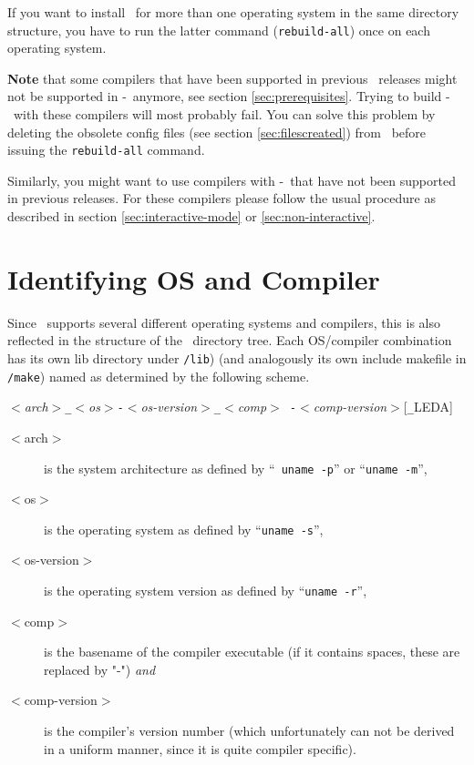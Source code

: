If you want to install \cgal\ for more than one operating system in
the same directory structure, you have to run the latter command
(\texttt{rebuild-all}) once on each operating system.

\textbf{Note} that some compilers that have been supported in previous
\cgal\ releases might not be supported in \cgal-\cgalrelease\ anymore,
see section \ref{sec:prerequisites}. Trying to build
\cgal-\cgalrelease\ with these compilers will most probably fail. You
can solve this problem by deleting the obsolete config files (see
section \ref{sec:filescreated}) from \cgalinstconfdir\ before issuing
the \texttt{rebuild-all} command.

Similarly, you might want to use compilers with \cgal-\cgalrelease\ 
that have not been supported in previous releases. For these compilers
please follow the usual procedure as described in section
\ref{sec:interactive-mode} or \ref{sec:non-interactive}.

\section{Identifying OS and Compiler}\label{sec:os-compiler-id}

Since \cgal\ supports several different operating systems and
compilers, this is also reflected in the structure of the \cgal\ 
directory tree. Each OS/compiler combination has its own lib directory
under \texttt{\cgaldir/lib}) (and analogously its own include
makefile\index{include makefile} in \texttt{\cgaldir/make}) named as
determined by the following scheme.
\begin{center}
  \textit{$<$arch$>$\texttt{\_}$<$os$>$\texttt{-}$<$os-version$>$\texttt{\_}$<$comp$>${\tt
    -}$<$comp-version$>$}[\texttt{\_}LEDA]
\end{center}

\begin{description}
\item[$<$arch$>$] is the system architecture as defined by ``{\tt
    uname -p}'' or ``\texttt{uname -m}'',
\item[$<$os$>$] is the operating system as defined by ``\texttt{uname
    -s}'',
\item[$<$os-version$>$] is the operating system version as defined by
  ``\texttt{uname -r}'',
\item[$<$comp$>$] is the basename of the compiler executable (if it
  contains spaces, these are replaced by "-") \textit{and}
\item[$<$comp-version$>$] is the compiler's version number (which
  unfortunately can not be derived in a uniform manner, since it is
  quite compiler specific).
\end{description}

